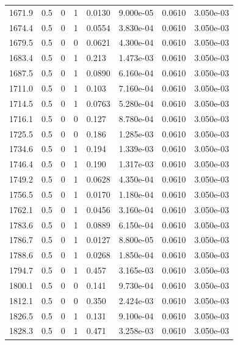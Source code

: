 \documentclass[preview]{standalone}
\begin{document}
{{{{{{{{\begin{tabular}{L{1.2cm}C{1.2cm} C{0.3cm}C{0.5cm} C{1.4cm}C{1.4cm} C{1.4cm}C{1.4cm}}
  1671.9  &   0.5  & 0     &  1 &  0.0130  & 9.000e-05  & 0.0610 &  3.050e-03   \\ 
  1674.4  &   0.5  & 0     &  1 &  0.0554  & 3.830e-04  & 0.0610 &  3.050e-03   \\ 
  1679.5  &   0.5  & 0     &  0 &  0.0621  & 4.300e-04  & 0.0610 &  3.050e-03   \\ 
  1683.4  &   0.5  & 0     &  1 &  0.213  & 1.473e-03  & 0.0610 &  3.050e-03   \\ 
  1687.5  &   0.5  & 0     &  1 &  0.0890  & 6.160e-04  & 0.0610 &  3.050e-03   \\ 
  1711.0  &   0.5  & 0     &  1 &  0.103  & 7.160e-04  & 0.0610 &  3.050e-03   \\ 
  1714.5  &   0.5  & 0     &  1 &  0.0763  & 5.280e-04  & 0.0610 &  3.050e-03   \\ 
  1716.1  &   0.5  & 0     &  0 &  0.127  & 8.780e-04  & 0.0610 &  3.050e-03   \\ 
  1725.5  &   0.5  & 0     &  0 &  0.186  & 1.285e-03  & 0.0610 &  3.050e-03   \\ 
  1734.6  &   0.5  & 0     &  1 &  0.194  & 1.339e-03  & 0.0610 &  3.050e-03   \\ 
  1746.4  &   0.5  & 0     &  1 &  0.190  & 1.317e-03  & 0.0610 &  3.050e-03   \\ 
  1749.2  &   0.5  & 0     &  1 &  0.0628  & 4.350e-04  & 0.0610 &  3.050e-03   \\ 
  1756.5  &   0.5  & 0     &  1 &  0.0170  & 1.180e-04  & 0.0610 &  3.050e-03   \\ 
  1762.1  &   0.5  & 0     &  1 &  0.0456  & 3.160e-04  & 0.0610 &  3.050e-03   \\ 
  1783.6  &   0.5  & 0     &  1 &  0.0889  & 6.150e-04  & 0.0610 &  3.050e-03   \\ 
  1786.7  &   0.5  & 0     &  1 &  0.0127  & 8.800e-05  & 0.0610 &  3.050e-03   \\ 
  1788.6  &   0.5  & 0     &  1 &  0.0268  & 1.850e-04  & 0.0610 &  3.050e-03   \\ 
  1794.7  &   0.5  & 0     &  1 &  0.457  & 3.165e-03  & 0.0610 &  3.050e-03   \\ 
  1800.1  &   0.5  & 0     &  0 &  0.141  & 9.730e-04  & 0.0610 &  3.050e-03   \\ 
  1812.1  &   0.5  & 0     &  0 &  0.350  & 2.424e-03  & 0.0610 &  3.050e-03   \\ 
  1826.5  &   0.5  & 0     &  1 &  0.131  & 9.100e-04  & 0.0610 &  3.050e-03   \\ 
  1828.3  &   0.5  & 0     &  1 &  0.471  & 3.258e-03  & 0.0610 &  3.050e-03   \\ 

\end{tabular}}}}}}}}}
\end{document}
